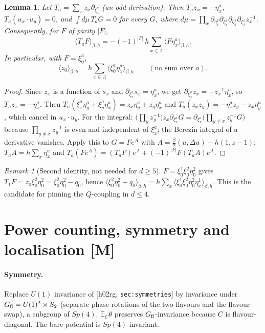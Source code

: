 \documentclass[11pt]{article}
\newtheorem{lemma}[theorem]{Lemma}
\theoremstyle{remark}
\newtheorem{remark}[theorem]{Remark}
\theoremstyle{definition}
\newcommand{\E}{\mathbb{E}}
\newcommand{\avg}[1]{\langle #1\rangle}
\newcommand{\st}[1]{\textsf{[#1]}}
\newcommand{\hr}[1]{\textup{[h02rg, \texttt{#1}]}}
\begin{document}
\begin{lemma}\label{lem:ward}
Let $T_a=\sum_xz_x\partial_{\xi^a_x}$ (an odd derivation). Then $T_az_x=-\eta^a_x$, $T_a(u_x\cdot u_y)=0$, and
$\int d\mu\,T_aG=0$ for every $G$, where $d\mu=\prod_x\partial_{\eta^2_x}\partial_{\xi^2_x}\partial_{\eta^1_x}\partial_{\xi^1_x}z_x^{-1}$.
Consequently, for $F$ of parity $|F|$,
\begin{equation}\label{e:ward-gen}
  \avg{T_aF}_{\beta,h}=-(-1)^{|F|}\,h\sum_{x\in\Lambda}\avg{F\eta^a_x}_{\beta,h}.
\end{equation}
In particular, with $F=\xi^a_0$,
\begin{equation}\label{e:W1}
  \avg{z_0}_{\beta,h}=h\sum_{x\in\Lambda}\avg{\xi^a_0\eta^a_x}_{\beta,h}\qquad(\text{no sum over }a).
\end{equation}
\end{lemma}

\begin{proof}
Since $z_x$ is a function of $s_x$ and $\partial_{\xi^a_x}s_x=\eta^a_x$, we get $\partial_{\xi^a_x}z_x=-z_x^{-1}\eta^a_x$, so $T_az_x=-\eta^a_x$.
Then $T_a(\xi^a_x\eta^a_y+\xi^a_y\eta^a_x)=z_x\eta^a_y+z_y\eta^a_x$ and $T_a(z_xz_y)=-\eta^a_xz_y-z_x\eta^a_y$, which cancel in $u_x\cdot u_y$.
For the integral: $\big(\prod_yz_y^{-1}\big)z_x\partial_{\xi^a_x}G=\partial_{\xi^a_x}\big(\prod_{y\ne x}z_y^{-1}G\big)$
because $\prod_{y\ne x}z_y^{-1}$ is even and independent of $\xi^a_x$; the Berezin integral of a derivative vanishes.
Apply this to $G=Fe^{A}$ with $A=\frac\beta2(u,\Delta u)-h(1,z-1)$: $T_aA=h\sum_x\eta^a_x$ and
$T_a(Fe^A)=(T_aF)e^A+(-1)^{|F|}F(T_aA)e^A$.
\end{proof}

\begin{remark}[Second identity, not needed for $d\ge5$]
$F=\xi^1_0\xi^2_0\eta^2_0$ gives $T_1F=z_0\xi^2_0\eta^2_0=\xi^2_0\eta^2_0-q_0$, hence
$\avg{\xi^2_0\eta^2_0-q_0}_{\beta,h}=h\sum_x\avg{\xi^1_0\xi^2_0\eta^2_0\eta^1_x}_{\beta,h}$.
This is the candidate for pinning the $Q$-coupling in $d\le4$.
\end{remark}

\section{Power counting, symmetry and localisation \st{M}}

\paragraph{Symmetry.} Replace $U(1)$ invariance of \hr{sec:symmetries} by invariance under
$G_{\rm fl}=U(1)^2\rtimes S_2$ (separate phase rotations of the two flavours and the flavour swap), a subgroup of $Sp(4)$.
$\E_{C}\theta$ preserves $G_{\rm fl}$-invariance because $C$ is flavour-diagonal. The bare potential is $Sp(4)$-invariant.
\end{document}
